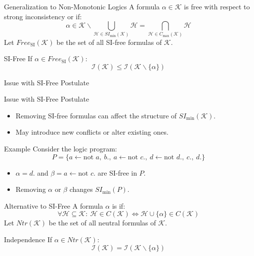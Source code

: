 \begin{frame}{Generalization to Non-Monotonic Logics}
    A formula \(\alpha \in \mathcal{K}\) is free with respect to strong inconsistency or  if:
    \[
        \alpha \in \mathcal{K} \backslash \bigcup\limits_{\mathcal{H} \in SI_{\min}(\mathcal{K})} \mathcal{H} = \bigcap\limits_{\mathcal{H} \in C_{\max}(\mathcal{K})} \mathcal{H}
    \]
    Let \(Free_{\text{SI}}(\mathcal{K})\) be the set of all SI-free formulas of \(\mathcal{K}\).
    \begin{block}{SI-Free}
        If \(\alpha \in Free_{\text{SI}}(\mathcal{K})\):
        \[
            \mathcal{I}(\mathcal{K}) \leq \mathcal{I}(\mathcal{K} \backslash \{\alpha\})
        \]
    \end{block}
\end{frame}

\begin{frame}{Issue with SI-Free Postulate}
    \begin{alertblock}{Issue with SI-Free Postulate}
        \begin{itemize}
            \item Removing SI-free formulas can affect the structure of \(SI_{\min}(\mathcal{K})\).
            \item May introduce new conflicts or alter existing ones.
        \end{itemize}
    \end{alertblock}
    \begin{exampleblock}{Example}
        Consider the logic program:
        \[
            P = \{a \leftarrow \text{not } a,\ b.,\ a \leftarrow \text{not } c.,\ d \leftarrow \text{not } d.,\ c.,\ d.\}
        \]
        \begin{itemize}
            \item \(\alpha = d.\) and \(\beta = a \leftarrow \text{not } c.\) are SI-free in \(P\).
            \item Removing \(\alpha\) or \(\beta\) changes \(SI_{\min}(P)\).
        \end{itemize}
    \end{exampleblock}
\end{frame}

\begin{frame}{Alternative to SI-Free}
    A formula \(\alpha\) is  if:
    \[
        \forall \mathcal{H} \subseteq \mathcal{K}:\ \mathcal{H} \in C(\mathcal{K}) \Leftrightarrow \mathcal{H} \cup \{\alpha\} \in C(\mathcal{K})
    \]
    Let \(Ntr(\mathcal{K})\) be the set of all neutral formulas of \(\mathcal{K}\).
    \begin{block}{Independence}
        If \(\alpha \in Ntr(\mathcal{K})\):
        \[
            \mathcal{I}(\mathcal{K}) = \mathcal{I}(\mathcal{K} \backslash \{\alpha\})
        \]
    \end{block}
\end{frame}

